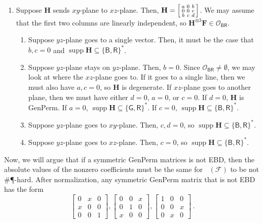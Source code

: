 \documentclass[11pt]{article}
\DeclareMathOperator{\holts}{Holant^*_3}
\DeclareMathOperator{\supp}{supp}
\newcommand{\db}{\mathsf{B}}
\newcommand{\dg}{\mathsf{G}}
\newcommand{\dr}{\mathsf{R}}
\newcommand{\genperm}{\textsf{GenPerm}\xspace}
\newcommand{\sph}{\#\P-hard\xspace}
\newcommand{\teh}{^{\otimes 3}}
\newcommand{\strspt}{\textsf{EBD}\xspace}
\begin{document}
\begin{enumerate}
\item
Suppose $\mathbf{H}$ sends $xy$-plane to $xz$-plane.
Then, $\mathbf{H} = \begin{bsmallmatrix}
  a & 0 & b \\
  0 & 0 & c \\
  b & c & d
\end{bsmallmatrix}$.
We may assume that the first two columns are linearly independent, so $\mathbf{H}\teh \mathbf{F} \in \mathcal{O}_{\db \dr}$.
\begin{enumerate}
\item Suppose $yz$-plane goes to a single vector.
    Then, it must be the case that $b, c = 0$ and $\supp \mathbf{H} \subseteq \{\db, \dr\}^*$.
  \item Suppose $yz$-plane stays on $yz$-plane.
    Then, $b = 0$.
    Since $\mathcal{O}_{\db \dr} \ne \emptyset$, we may look at where the $xz$-plane goes to.
    If it goes to a single line, then we must also have $a, c = 0$, so $\mathbf{H}$ is degenerate.
    If $xz$-plane goes to another plane, then we must have either $d = 0$, $a = 0$, or $c = 0$.
    If $d = 0$, $\mathbf{H}$ is \genperm.
    If $a = 0$, $\supp \mathbf{H} \subseteq \{\dg, \dr\}^*$.
    If $c = 0$, $\supp \mathbf{H} \subseteq \{\db, \dr\}^*$.
  \item Suppose $yz$-plane goes to $xy$-plane.
    Then, $c, d = 0$, so $\supp \mathbf{H} \subseteq \{\db, \dr\}^*$.
  \item Suppose $yz$-plane goes to $xz$-plane.
    Then, $c = 0$, so $\supp \mathbf{H} \subseteq \{\db, \dr\}^*$.
\end{enumerate}
\end{enumerate}
Now, we will argue that if a symmetric \genperm matrices is not \strspt, then the absolute values of the nonzero coefficients must be the same for $\holts(\mathcal{F})$ to be not \sph.
After normalization, any symmetric \genperm matrix that is not \strspt has the form
\[
  \begin{bmatrix}
    0 & x & 0 \\
    x & 0 & 0 \\
    0 & 0 & 1
    \end{bmatrix}, \begin{bmatrix}
    0 & 0 & x \\
    0 & 1 & 0 \\
    x & 0 & 0 
    \end{bmatrix}, \begin{bmatrix}
    1 & 0 & 0 \\
    0 & 0 & x \\
    0 & x & 0
  \end{bmatrix} \, .
\]
\end{document}
